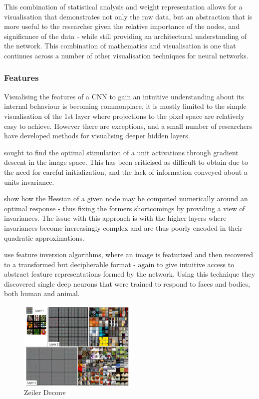 \documentclass[a4paper,11pt,titlepage]{article}
\begin{document}
	 This combination of statistical analysis and weight representation allows for a visualisation that demonstrates not only the raw data, but an abstraction that is more useful to the researcher given the relative importance of the nodes, and significance of the data - while still providing an architectural understanding of the network. This combination of mathematics and visualisation is one that continues across a number of other visualisation techniques for neural networks.
	 
	\subsubsection{Features}
		Visualising the features of a CNN to gain an intuitive understanding about its internal behaviour is becoming commonplace, it is mostly limited to the simple visualisation of the 1st layer where projections to the pixel space are relatively easy to achieve. However there are exceptions, and a small number of researchers have developed methods for visualising deeper hidden layers.
		\par 
		\textbf{\cite{Erhan2009}} sought to find the optimal stimulation of a unit activations through gradient descent in the image space. This has been criticised as difficult to obtain due to the need for careful initialization, and the lack of information conveyed about a units invariance. 
		\par 
		\textbf{\cite{Le2010}} show how the Hessian of a given node may be computed numerically around an optimal response - thus fixing the formers shortcomings by providing a view of invariances. The issue with this approach is with the higher layers where invariances become increasingly complex and are thus poorly encoded in their quadratic approximations. 
		\par 
		\textbf{\cite{Vondrick2013a}} use feature inversion algorithms, where an image is featurized and then recovered to a transformed but decipherable format - again to give intuitive access to abstract feature representations formed by the network. Using this technique they discovered single deep neurons that were trained to respond to faces and bodies, both human and animal. 
		\par
		
		\begin{figure}[H]
			\centering	
    			\includegraphics[width=0.5\textwidth]{img/zeiler_deconv.png} 
    			\caption{Zeiler Deconv}%
 		\end{figure}
 		
\end{document}
